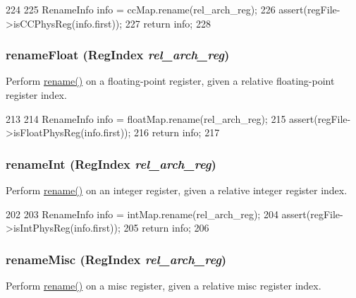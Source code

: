 \begin{DoxyCode}
224     {
225         RenameInfo info = ccMap.rename(rel_arch_reg);
226         assert(regFile->isCCPhysReg(info.first));
227         return info;
228     }
\end{DoxyCode}
\hypertarget{classUnifiedRenameMap_a64fe4a0e62e47d9087096b285d6b8d9f}{
\subsubsection[{renameFloat}]{ renameFloat ({\bf RegIndex} {\em rel\_\-arch\_\-reg})}}
\label{classUnifiedRenameMap_a64fe4a0e62e47d9087096b285d6b8d9f}
Perform \hyperlink{classUnifiedRenameMap_a7942f39856cc0a6ba2479855d2a7ab53}{rename()} on a floating-\/point register, given a relative floating-\/point register index. 


\begin{DoxyCode}
213     {
214         RenameInfo info = floatMap.rename(rel_arch_reg);
215         assert(regFile->isFloatPhysReg(info.first));
216         return info;
217     }
\end{DoxyCode}
\hypertarget{classUnifiedRenameMap_a73e9d8eeeeacc94d05a9cbd8524dc893}{
\subsubsection[{renameInt}]{ renameInt ({\bf RegIndex} {\em rel\_\-arch\_\-reg})}}
\label{classUnifiedRenameMap_a73e9d8eeeeacc94d05a9cbd8524dc893}
Perform \hyperlink{classUnifiedRenameMap_a7942f39856cc0a6ba2479855d2a7ab53}{rename()} on an integer register, given a relative integer register index. 


\begin{DoxyCode}
202     {
203         RenameInfo info = intMap.rename(rel_arch_reg);
204         assert(regFile->isIntPhysReg(info.first));
205         return info;
206     }
\end{DoxyCode}
\hypertarget{classUnifiedRenameMap_a7d34d22eeeecf2193f17c5f6124db3e8}{
\subsubsection[{renameMisc}]{ renameMisc ({\bf RegIndex} {\em rel\_\-arch\_\-reg})}}
\label{classUnifiedRenameMap_a7d34d22eeeecf2193f17c5f6124db3e8}
Perform \hyperlink{classUnifiedRenameMap_a7942f39856cc0a6ba2479855d2a7ab53}{rename()} on a misc register, given a relative misc register index. 


